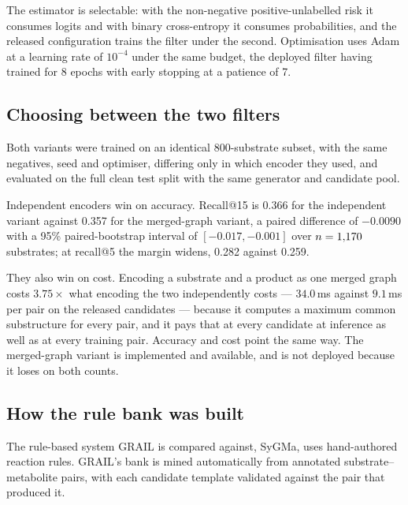 The estimator is selectable: with the non-negative positive-unlabelled risk it consumes logits
and with binary cross-entropy it consumes probabilities, and the released configuration trains the
filter under the second. Optimisation uses Adam at a learning rate of $10^{-4}$ under the same budget, the deployed
filter having trained for $8$ epochs
with early stopping at a patience of 7.

\subsection{Choosing between the two filters}

Both variants were trained on an identical 800-substrate subset, with the same negatives, seed and
optimiser, differing only in which encoder they used, and evaluated on the full clean test split
with the same generator and candidate pool.

Independent encoders win on accuracy. Recall@15 is 0.366 for the independent variant against 0.357
for the merged-graph variant, a paired difference of $-0.0090$ with a 95\% paired-bootstrap interval of
$[-0.017,-0.001]$ over $n=1{,}170$ substrates; at recall@5 the margin widens, 0.282 against 0.259.

They also win on cost. Encoding a substrate and a product as one merged graph costs
$3.75\times$ what encoding the two independently costs --- $34.0$\,ms against
$9.1$\,ms per pair on the released candidates --- because it computes a maximum
common substructure for every pair, and it pays that at every candidate at inference as well as at
every training pair. Accuracy and cost point the same way. The merged-graph variant is implemented and available, and is not deployed because it loses on both counts.

\subsection{How the rule bank was built}

The rule-based system GRAIL is compared against, SyGMa, uses hand-authored reaction
rules. GRAIL's bank is mined automatically from annotated substrate--metabolite pairs, with each
candidate template validated against the pair that produced it.

